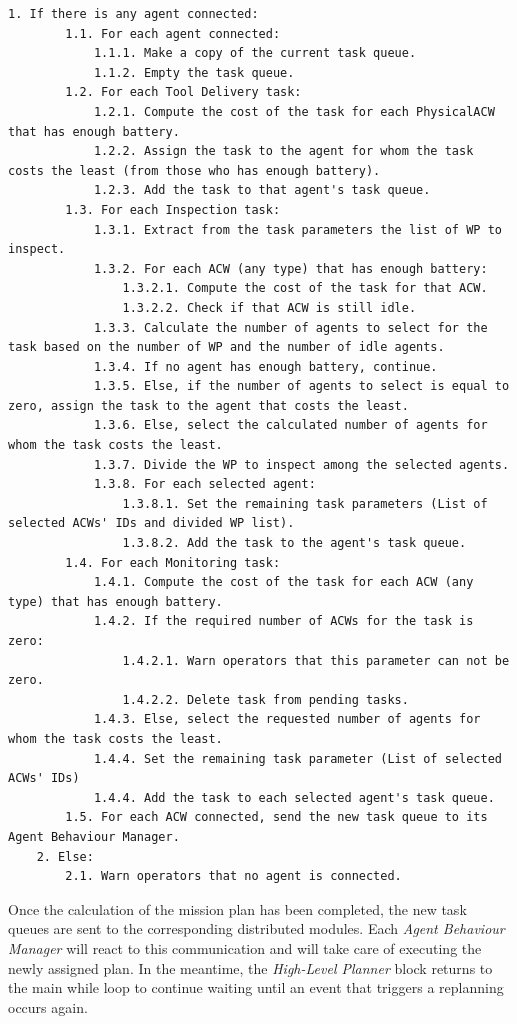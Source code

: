 \documentclass[fontsize=11pt, English=false, Español=true, Myfinal=true, twoside, numbers=noenddot]{scrbook}
\begin{document}
{\begin{lstlisting}[caption={Task planning function's pseudocode}, breaklines=true, label=ps:performTaskAllocation]
	1. If there is any agent connected:
		1.1. For each agent connected:
			1.1.1. Make a copy of the current task queue.
			1.1.2. Empty the task queue.
		1.2. For each Tool Delivery task:
			1.2.1. Compute the cost of the task for each PhysicalACW that has enough battery.
			1.2.2. Assign the task to the agent for whom the task costs the least (from those who has enough battery).
			1.2.3. Add the task to that agent's task queue.
		1.3. For each Inspection task:
			1.3.1. Extract from the task parameters the list of WP to inspect.
			1.3.2. For each ACW (any type) that has enough battery:
				1.3.2.1. Compute the cost of the task for that ACW. 
				1.3.2.2. Check if that ACW is still idle.
			1.3.3. Calculate the number of agents to select for the task based on the number of WP and the number of idle agents.
			1.3.4. If no agent has enough battery, continue.
			1.3.5. Else, if the number of agents to select is equal to zero, assign the task to the agent that costs the least.
			1.3.6. Else, select the calculated number of agents for whom the task costs the least.
			1.3.7. Divide the WP to inspect among the selected agents.
			1.3.8. For each selected agent:
				1.3.8.1. Set the remaining task parameters (List of selected ACWs' IDs and divided WP list).
				1.3.8.2. Add the task to the agent's task queue.
		1.4. For each Monitoring task:
			1.4.1. Compute the cost of the task for each ACW (any type) that has enough battery.
			1.4.2. If the required number of ACWs for the task is zero:
				1.4.2.1. Warn operators that this parameter can not be zero.
				1.4.2.2. Delete task from pending tasks.
			1.4.3. Else, select the requested number of agents for whom the task costs the least.
			1.4.4. Set the remaining task parameter (List of selected ACWs' IDs)
			1.4.4. Add the task to each selected agent's task queue.
		1.5. For each ACW connected, send the new task queue to its Agent Behaviour Manager.
	2. Else:
		2.1. Warn operators that no agent is connected.
\end{lstlisting}

Once the calculation of the mission plan has been completed, the new task queues are sent to the corresponding distributed modules. Each \emph{Agent Behaviour Manager} will react to this communication and will take care of executing the newly assigned plan. In the meantime, the \emph{High-Level Planner} block returns to the main while loop to continue waiting until an event that triggers a replanning occurs again.

}
\end{document}
